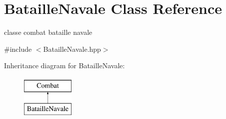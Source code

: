 \hypertarget{classBatailleNavale}{\section{Bataille\-Navale Class Reference}
\label{classBatailleNavale}
}


classe combat bataille navale  




{\ttfamily \#include $<$Bataille\-Navale.\-hpp$>$}

Inheritance diagram for Bataille\-Navale\-:\begin{figure}[H]
\begin{center}
\leavevmode
\includegraphics[height=2.000000cm]{classBatailleNavale}
\end{center}
\end{figure}
